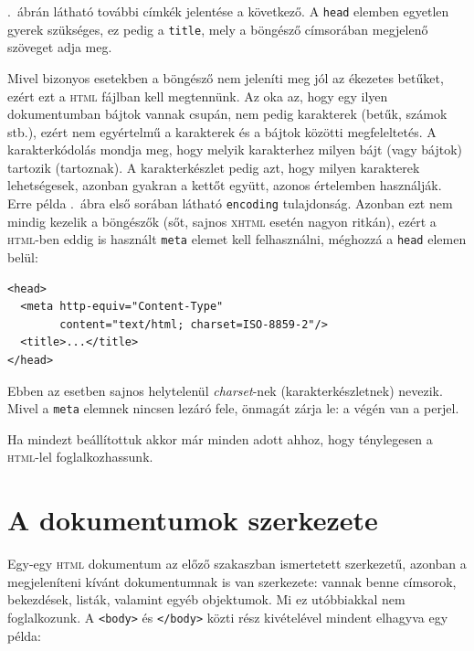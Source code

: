 .\ ábrán látható további címkék jelentése a következő. A
\texttt{head} elemben egyetlen gyerek szükséges, ez pedig a \texttt{title}, mely
a böngésző címsorában megjelenő szöveget adja meg.

Mivel bizonyos esetekben a böngésző nem jeleníti meg jól az ékezetes betűket,
ezért ezt a \textsc{html} fájlban kell megtennünk. Az oka az, hogy egy ilyen
dokumentumban bájtok vannak csupán, nem pedig karakterek (betűk, számok stb.),
ezért nem egyértelmű a karakterek és a bájtok közötti megfeleltetés. A
karakterkódolás mondja meg, hogy melyik karakterhez milyen bájt (vagy bájtok)
tartozik (tartoznak). A karakterkészlet pedig azt, hogy milyen karakterek
lehetségesek, azonban gyakran a kettőt együtt, azonos értelemben
használják. Erre példa .\ ábra első sorában látható
\texttt{encoding} tulajdonság. Azonban ezt nem mindig kezelik a böngészők (sőt,
sajnos \textsc{xhtml} esetén nagyon ritkán), ezért a \textsc{html}-ben
eddig is használt \texttt{meta} elemet kell felhasználni, méghozzá a
\texttt{head} elemen belül:

\begin{Verbatim}[frame=single]
<head>
  <meta http-equiv="Content-Type"
        content="text/html; charset=ISO-8859-2"/>
  <title>...</title>
</head>
\end{Verbatim}

\noindent Ebben az esetben sajnos helytelenül \emph{charset}-nek
(karakterkészletnek)
nevezik. Mivel a \texttt{meta} elemnek nincsen lezáró fele, önmagát zárja le: a
végén van a perjel.

Ha mindezt beállítottuk akkor már minden adott ahhoz, hogy ténylegesen a
\textsc{html}-lel foglalkozhassunk.

\section{A dokumentumok szerkezete}
Egy-egy \textsc{html} dokumentum az előző szakaszban ismertetett szerkezetű,
azonban a megjeleníteni kívánt dokumentumnak is van szerkezete: vannak benne
címsorok, bekezdések, listák, valamint egyéb objektumok. Mi ez utóbbiakkal nem
foglalkozunk. A \verb|<body>| és \verb|</body>| közti rész kivételével mindent
elhagyva egy példa: %

